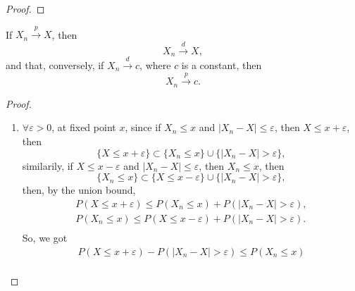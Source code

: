 \begin{proof}

\end{proof}

\begin{theorem}
    If $X_{n}\stackrel{p}{\rightarrow}X$, then
    \begin{equation}
        X_{n}\stackrel{d}{\rightarrow}X,
    \end{equation}
    and that, conversely, if $X_{n}\stackrel{d}{\rightarrow}c$, where $c$ is a constant, then
    \begin{equation}
        X_{n}\stackrel{p}{\rightarrow}c.
    \end{equation}
\end{theorem}

\begin{proof}
    \begin{enumerate}
        \item $\forall\varepsilon>0$, at fixed point $x$, since if $X_n\leq x$ and $|X_n-X|\leq\varepsilon$, then $X\leq x+\varepsilon$, then
              \begin{equation*}
                  \{X\leq x+\varepsilon\}\subset\{X_n\leq x\}\cup\{|X_n-X|>\varepsilon\},
              \end{equation*}
              similarily, if $X\leq x-\varepsilon$ and $|X_n-X|\leq\varepsilon$, then $X_n\leq x$, then
              \begin{equation*}
                  \{X_n\leq x\}\subset\{X\leq x-\varepsilon\}\cup\{|X_n-X|>\varepsilon\},
              \end{equation*}
              then, by the union bound,
              \begin{equation*}
                  \begin{gathered}
                      P\left(X\leq x+\varepsilon\right)\leq P\left(X_n\leq x\right)+P\left(|X_n-X|>\varepsilon\right),\\
                      P\left(X_n\leq x\right)\leq P\left(X\leq x-\varepsilon\right)+P\left(|X_n-X|>\varepsilon\right).\\
                  \end{gathered}
              \end{equation*}
              So, we got
              \begin{equation*}
                  \begin{gathered}
                      P\left(X\leq x+\varepsilon\right)-P\left(|X_n-X|>\varepsilon\right)\leq P\left(X_n\leq x\right) \\

\end{gathered}
\end{equation*}
\end{enumerate}
\end{proof}

